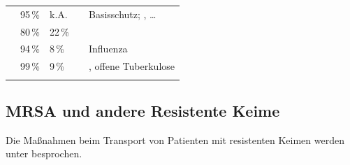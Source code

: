 \begin{table}[H]
\begin{gWideParEnv}
\begin{minipage}{\linewidth}

\renewcommand{\thefootnote}{\alph{footnote}}
\begin{tabulary}{\linewidth}{LLLLL}
&
\footnotemark[1]\footnotemark[2]
&
\footnotemark[3] &
&
\\\midrule\addlinespace
{} &
95\,\%\footnotemark[4] & k.A. & & Basisschutz; , \ldots
\\\addlinespace {} & 80\,\% & 22\,\% & &
\\\addlinespace
{} & 94\,\% & 8\,\% & & Influenza
\\\addlinespace
{} & 99\,\% & 9\,\% & & , offene Tuberkulose
\\\addlinespace\bottomrule
\end{tabulary}
\renewcommand{\thefootnote}{\arabic{footnote}}
\end{minipage}
\end{gWideParEnv}\end{table} 
\subsection{MRSA und andere Resistente Keime}

Die Maßnahmen beim Transport von Patienten mit resistenten Keimen
werden unter  besprochen.





\nocite{KayserMikrobiologie10}
\nocite{HahnMikrobio6}
\nocite{BLIM3}
\nocite{OHCSP7}
\nocite{OeAG2007}


\clearpage
\ChapterBibliography
